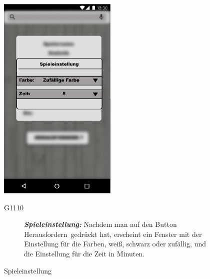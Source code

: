 \documentclass[parskip=full]{scrartcl}
\begin{document}
\begin{figure}[htp]
		\begin{minipage}[t]{6cm}
			\vspace{0pt}
			\includegraphics[height=100mm]{custom_match.png}
			\caption{Spieleinstellung}
			\label{fig:Spieleinstellung}
		\end{minipage}
		\hfill
		\begin{minipage}[t]{6cm}
			\vspace{0pt}
			\begin{description}
				\item[G1110]\textbf{\textit{Spieleinstellung: }} Nachdem man auf den Button \glqq Herausfordern\grqq\ gedrückt hat, erscheint ein Fenster mit der Einstellung für die Farben, weiß, schwarz oder zufällig, und die Einstellung für die Zeit in Minuten.
			\end{description}
		\end{minipage}
	\end{figure}
	
\end{document}
